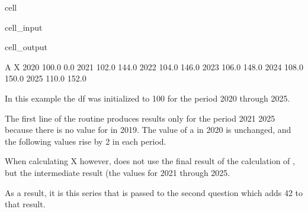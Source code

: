 \documentclass[letterpaper,10pt,english]{jupyterBook}
\begin{document}
\begin{sphinxuseclass}{cell}\begin{sphinxVerbatimInput}

\begin{sphinxuseclass}{cell_input}
\begin{sphinxVerbatim}[commandchars=\\\{\}]
  


\end{sphinxVerbatim}

\end{sphinxuseclass}\end{sphinxVerbatimInput}
\begin{sphinxVerbatimOutput}

\begin{sphinxuseclass}{cell_output}
\begin{sphinxVerbatim}[commandchars=\\\{\}]
          A      X
2020  100.0    0.0
2021  102.0  144.0
2022  104.0  146.0
2023  106.0  148.0
2024  108.0  150.0
2025  110.0  152.0
\end{sphinxVerbatim}

\end{sphinxuseclass}\end{sphinxVerbatimOutput}

\end{sphinxuseclass}
\sphinxAtStartPar
In this example the  df was initialized to 100 for the period 2020 through 2025.

\sphinxAtStartPar
The first line of the  routine produces results only for the period 2021 \sphinxhyphen{} 2025 because there is no value for  in 2019.  The value of a in 2020 is unchanged, and the following values rise by 2 in each period.

\sphinxAtStartPar
When calculating X however,  does not use the final result of the calculation of , but the intermediate result (the values for 2021 through 2025.

\sphinxAtStartPar
As a result, it is this series that is passed to the second question which adds 42 to that result.
\end{document}
